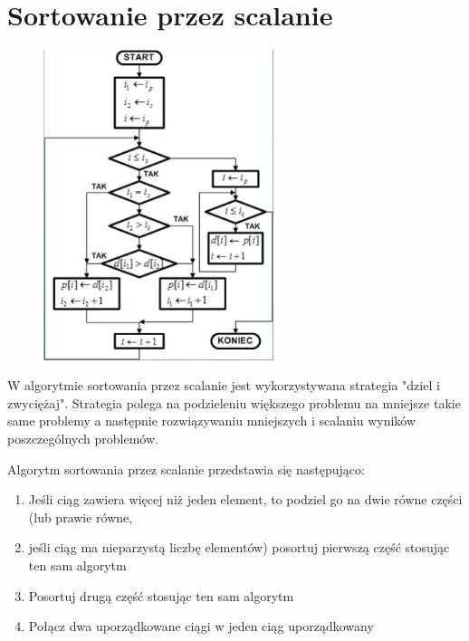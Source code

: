 \documentclass[a4paper,11pt]{article}
\begin{document}
\section{Sortowanie przez scalanie}
\begin{figure}
\begin{center}
\vspace{-20pt}
\includegraphics[width=0.6\textwidth]{rys12}
\end{center}
\vspace{-20pt}
\vspace{-10pt}
\end{figure}
W algorytmie sortowania przez scalanie jest 
wykorzystywana strategia "dziel i zwyciężaj". Strategia 
polega na podzieleniu większego problemu na mniejsze 
takie same problemy a następnie rozwiązywaniu 
mniejszych i scalaniu wyników poszczególnych 
problemów. 
 
 
Algorytm sortowania przez scalanie przedstawia się 
następująco: 
\begin{enumerate}
\item Jeśli ciąg zawiera więcej niż jeden element, to podziel 
go na dwie równe części (lub prawie równe, 
\item jeśli ciąg ma nieparzystą liczbę elementów) posortuj 
pierwszą część stosując ten sam algorytm 
\item Posortuj drugą część stosując ten sam algorytm 
\item Połącz dwa uporządkowane ciągi w jeden ciąg 
uporządkowany 
\end{enumerate}
\newpage
\end{document}
